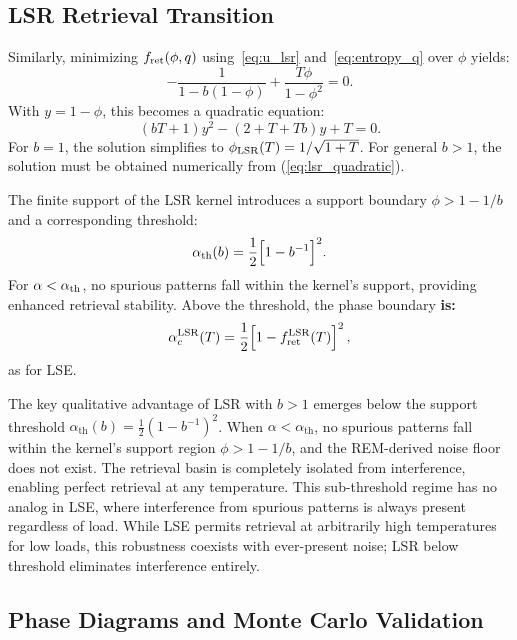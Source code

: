 \documentclass{article}
\theoremstyle{plain}
\theoremstyle{definition}
\theoremstyle{remark}
\begin{document}
\subsection{\textbf{LSR Retrieval Transition}}

Similarly, minimizing $f_{\rm ret}(\phi, q)$ using~\eqref{eq:u_lsr} and~\eqref{eq:entropy_q} over $\phi$ yields:
\begin{equation}
    -\frac{1}{1 - b(1-\phi)} + \frac{T\phi}{1-\phi^2} = 0.
\end{equation}
With $y = 1 - \phi$, this becomes a quadratic equation:
\begin{equation}
    (bT + 1)y^2 - (2 + T + Tb)y + T = 0.
    \label{eq:lsr_quadratic}
\end{equation}
For $b = 1$, the solution simplifies to $\phi_{\rm LSR}(T) = 1/\sqrt{1+T}$. For general $b > 1$, the solution must be obtained numerically from (\ref{eq:lsr_quadratic}).

The finite support of the LSR kernel introduces a support boundary $\phi > 1 - 1/b$ and a corresponding threshold:
\begin{equation}
    \alpha_{\rm th}(b) = \frac{1}{2}\Big[1 - b^{-1}\Big]^2.
\end{equation}
For $\alpha < \alpha_{\rm th}$, no spurious patterns fall within the kernel's support, providing enhanced retrieval stability. Above the threshold, the phase boundary \textbf{is:}
\begin{equation}
    \alpha_c^{\rm LSR}(T) = \frac{1}{2} \Big[1 - f_{\rm ret}^{\rm LSR}(T) \Big]^2\,,
    \label{eq:alpha_lsr}
\end{equation}
as for LSE.

The key qualitative advantage of LSR with $b > 1$ emerges below the support threshold $\alpha_{\text{th}}(b) = \frac{1}{2}(1 - b^{-1})^2$. When $\alpha < \alpha_{\text{th}}$, no spurious patterns fall within the kernel's support region $\phi > 1 - 1/b$, and the REM-derived noise floor does not exist. The retrieval basin is completely isolated from interference, enabling perfect retrieval at any temperature. This sub-threshold regime has no analog in LSE, where interference from spurious patterns is always present regardless of load. While LSE permits retrieval at arbitrarily high temperatures for low loads, this robustness coexists with ever-present noise; LSR below threshold eliminates interference entirely.


\subsection{Phase Diagrams and Monte Carlo Validation}
\end{document}
